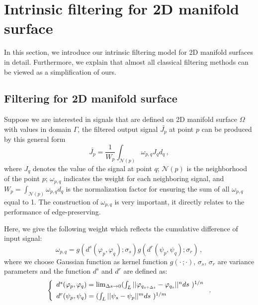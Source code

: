 \section{Intrinsic filtering for 2D manifold surface}

In this section, we introduce our intrinsic filtering model for 2D manifold surfaces in detail.
Furthermore, we explain that almost all classical filtering methods can be viewed as a simplification of ours.

\subsection{Filtering for 2D manifold surface}

Suppose we are interested in signals that are defined on 2D manifold surface $\Omega$ with values in domain $\Gamma$,
the filtered output signal $\bar{J_p}$ at point $p$ can be produced by this general form
\begin{equation}
\label{Eq:GeneralForm}
\bar{J_{p}} = \frac{1}{W_{p}}\int_{\mathcal{N}(p)}\omega_{p, q}J_{q}d_{q}\, ,
\end{equation}
where $J_{q}$ denotes the value of the signal at point $q$; $\mathcal{N}(p)$ is the neighborhood of the point $p$;
$\omega_{p, q}$ indicates the weight for each neighboring signal,
and $W_{p} = \int_{\mathcal{N}(p)}\omega_{p, q}d_{q}$ is the normalization factor for ensuring the sum of all $\omega_{p,q}$ equal to 1.
The construction of $\omega_{p,q}$ is very important, it directly relates to the performance of edge-preserving.

Here, we give the following weight which reflects the cumulative difference of input signal:
\begin{equation}
\label{Eq:IntrinsicWeight}
\omega_{p,q} = g(d^{s}(\varphi_{p}, \varphi_{q}); \sigma_{s})g(d^{r}(\psi_p, \psi_q); \sigma_{r})\, ,
\end{equation}
where we choose Gaussian function as kernel function $g(\cdot \,; \cdot)$, $\sigma_{s}$, $\sigma_{r}$ are variance parameters and the function $d^s$ and $d^r$ are defined as:
 \begin{equation}
 \label{Eq:IntrinsicDistance}
 \left \{
 \begin{array}{ll}
        d^{s}(\varphi_p, \varphi_q) = \lim_{\Delta{s}\to 0} (\int_{L}||\varphi_{q_{s + \Delta{s}}} - \varphi_{q_s}||^{n}ds\,\,)^{1/n} \vspace{1.5mm} \\
        d^{r}(\psi_p, \psi_q) = (\int_{L}||\psi_{s} - \psi_{p}||^{m}ds\,\,)^{1/m} \\
 \end{array}
 \right. .
 \end{equation}

